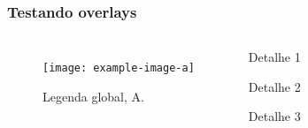 \documentclass{beamer}
\begin{document}
		
	\begin{frame}
		\frametitle{Testando overlays}
		 \begin{columns}
			
				\begin{figure}
					\texttt{[image: example-image-a]}
					\caption{Legenda global, A.}
				\end{figure}
			
		
				
				\begin{enumerate}
					 {\item<1>[1.] Detalhe 1}
					 {\item<2>[2.] Detalhe 2}
					 {\item<3>[3.] Detalhe 3}
				\end{enumerate}

		\end{columns}
	\end{frame}
\end{document}
